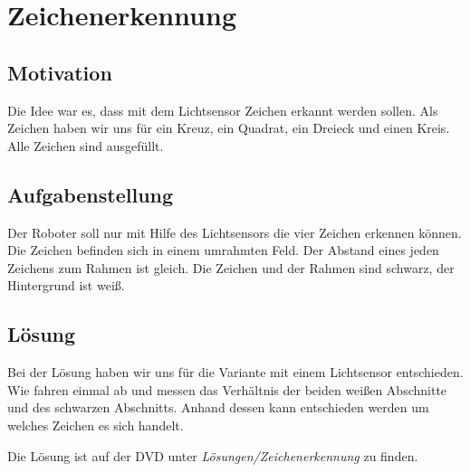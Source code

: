 \chapter{Zeichenerkennung}
\section{Motivation}
Die Idee war es, dass mit dem Lichtsensor Zeichen erkannt werden sollen. Als Zeichen haben wir uns für ein Kreuz, ein Quadrat, ein Dreieck und einen Kreis. Alle Zeichen sind ausgefüllt.

\section{Aufgabenstellung}
Der Roboter soll nur mit Hilfe des Lichtsensors die vier Zeichen erkennen können. Die Zeichen befinden sich in einem umrahmten Feld. Der Abstand eines jeden Zeichens zum Rahmen ist gleich. Die Zeichen und der Rahmen sind schwarz, der Hintergrund ist weiß.

\section{Lösung}

Bei der Lösung haben wir uns für die Variante mit einem Lichtsensor entschieden. Wie fahren einmal ab und messen das Verhältnis der beiden weißen Abschnitte und des schwarzen Abschnitts. Anhand dessen kann entschieden werden um welches Zeichen es sich handelt.

Die Lösung ist auf der DVD unter \textit{Lösungen/Zeichenerkennung} zu finden.